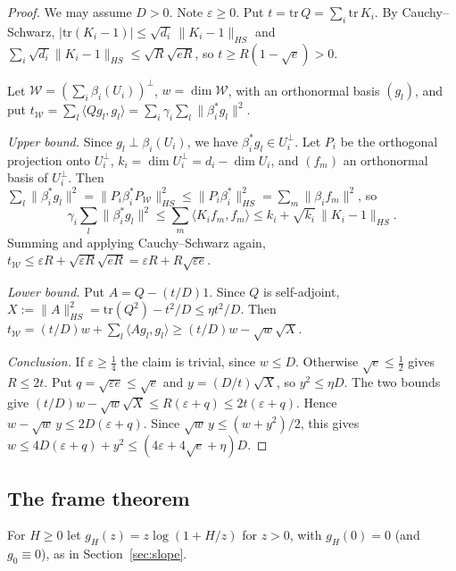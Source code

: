 \documentclass[11pt]{amsart}
\theoremstyle{plain}
\theoremstyle{definition}
\numberwithin{equation}{section}
\begin{document}
\begin{proof}
We may assume $D>0$. Note $\varepsilon\ge0$. Put $t=\mathrm{tr}\,Q=\sum_i\mathrm{tr}\,K_i$. By
Cauchy--Schwarz, $|\mathrm{tr}(K_i-1)|\le\sqrt{d_i}\,\|K_i-1\|_{HS}$ and
$\sum_i\sqrt{d_i}\|K_i-1\|_{HS}\le\sqrt R\sqrt{eR}$, so $t\ge R(1-\sqrt e)>0$.

Let $\mathcal W=(\sum_i\beta_i(U_i))^\perp$, $w=\dim\mathcal W$, with an orthonormal basis
$(g_l)$, and put $t_{\mathcal W}=\sum_l\langle Qg_l,g_l\rangle=\sum_i\gamma_i\sum_l\|\beta_i^*g_l\|^2$.

\emph{Upper bound.} Since $g_l\perp\beta_i(U_i)$, we have $\beta_i^*g_l\in U_i^\perp$. Let $P_i$ be the
orthogonal projection onto $U_i^\perp$, $k_i=\dim U_i^\perp=d_i-\dim U_i$, and $(f_m)$ an orthonormal
basis of $U_i^\perp$. Then
$\sum_l\|\beta_i^*g_l\|^2=\|P_i\beta_i^*P_{\mathcal W}\|_{HS}^2\le\|P_i\beta_i^*\|_{HS}^2=\sum_m\|\beta_if_m\|^2$,
so
\[
\gamma_i\sum_l\|\beta_i^*g_l\|^2\le\sum_m\langle K_if_m,f_m\rangle\le k_i+\sqrt{k_i}\,\|K_i-1\|_{HS}.
\]
Summing and applying Cauchy--Schwarz again,
$t_{\mathcal W}\le\varepsilon R+\sqrt{\varepsilon R}\sqrt{eR}=\varepsilon R+R\sqrt{\varepsilon e}$.

\emph{Lower bound.} Put $A=Q-(t/D)1$. Since $Q$ is self-adjoint,
$X:=\|A\|_{HS}^2=\mathrm{tr}(Q^2)-t^2/D\le\eta t^2/D$. Then
$t_{\mathcal W}=(t/D)w+\sum_l\langle Ag_l,g_l\rangle\ge(t/D)w-\sqrt w\sqrt X$.

\emph{Conclusion.} If $\varepsilon\ge\frac14$ the claim is trivial, since $w\le D$. Otherwise
$\sqrt e\le\frac12$ gives $R\le2t$. Put $q=\sqrt{\varepsilon e}\le\sqrt e$ and $y=(D/t)\sqrt X$, so
$y^2\le\eta D$. The two bounds give $(t/D)w-\sqrt w\sqrt X\le R(\varepsilon+q)\le2t(\varepsilon+q)$. Hence
$w-\sqrt w\,y\le2D(\varepsilon+q)$. Since $\sqrt w\,y\le(w+y^2)/2$, this gives
$w\le4D(\varepsilon+q)+y^2\le(4\varepsilon+4\sqrt e+\eta)D$.
\end{proof}

\subsection{The frame theorem}

For $H\ge0$ let $g_H(z)=z\log(1+H/z)$ for $z>0$, with $g_H(0)=0$ (and $g_0\equiv0$), as in Section~\ref{sec:slope}.
\end{document}
